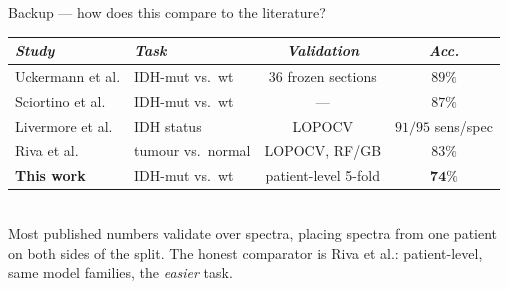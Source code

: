 \documentclass[aspectratio=169, 11pt]{beamer}
\begin{document}
\begin{frame}{Backup --- how does this compare to the literature?}
  \vspace{0.4em}
  \centering
  \small
  \begin{tabular}{llcc}
    \toprule
    \emph{Study} & \emph{Task} & \emph{Validation} & \emph{Acc.}\\
    \midrule
    Uckermann et al. & IDH-mut vs.\ wt & 36 frozen sections & $89\%$\\
    Sciortino et al. & IDH-mut vs.\ wt & --- & $87\%$\\
    Livermore et al. & IDH status & LOPOCV & $91/95$ sens/spec\\
    \midrule
    Riva et al. & tumour vs.\ normal & \alert{LOPOCV}, RF/GB & $83\%$\\
    \textbf{This work} & IDH-mut vs.\ wt & \alert{patient-level 5-fold} & $\mathbf{74\%}$\\
    \bottomrule
  \end{tabular}\\[0.7em]
  \small
  Most published numbers validate over \alert{spectra}, placing spectra from one
  patient on both sides of the split. The honest comparator is Riva et al.:
  patient-level, same model families, the \emph{easier} task.
\end{frame}
\end{document}
